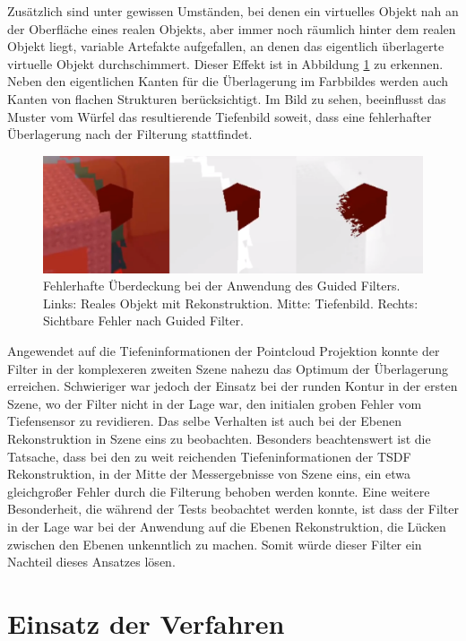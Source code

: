 Zusätzlich sind unter gewissen Umständen, bei denen ein virtuelles Objekt nah an der Oberfläche eines realen Objekts, aber immer noch räumlich hinter dem realen Objekt liegt, variable Artefakte aufgefallen, an denen das eigentlich überlagerte virtuelle Objekt durchschimmert. Dieser Effekt ist in Abbildung \ref{fig:artifacts} zu erkennen. Neben den eigentlichen Kanten für die Überlagerung im Farbbildes werden auch Kanten von flachen Strukturen berücksichtigt. Im Bild zu sehen, beeinflusst das Muster vom Würfel das resultierende Tiefenbild soweit, dass eine fehlerhafter Überlagerung nach der Filterung stattfindet. \\
 
\begin{figure}[h]
  \centering
	\includegraphics[width=1.0\textwidth]{content/images/artifacts.png} 
  \caption{Fehlerhafte Überdeckung bei der Anwendung des Guided Filters. Links: Reales Objekt mit Rekonstruktion. Mitte: Tiefenbild. Rechts: Sichtbare Fehler nach Guided Filter.}
  \label{fig:artifacts}
\end{figure}

Angewendet auf die Tiefeninformationen der Pointcloud Projektion konnte der Filter in der komplexeren zweiten Szene nahezu das Optimum der Überlagerung erreichen. Schwieriger war jedoch der Einsatz bei der runden Kontur in der ersten Szene, wo der Filter nicht in der Lage war, den initialen groben Fehler vom Tiefensensor zu revidieren. Das selbe Verhalten ist auch bei der Ebenen Rekonstruktion in Szene eins zu beobachten. Besonders beachtenswert ist die Tatsache, dass bei den zu weit reichenden Tiefeninformationen der TSDF Rekonstruktion, in der Mitte der Messergebnisse von Szene eins, ein etwa gleichgroßer Fehler durch die Filterung behoben werden konnte. Eine weitere Besonderheit, die während der Tests beobachtet werden konnte, ist dass der Filter in der Lage war bei der Anwendung auf die Ebenen Rekonstruktion, die Lücken zwischen den Ebenen unkenntlich zu machen. Somit würde dieser Filter ein Nachteil dieses Ansatzes lösen.\\

\section{Einsatz der Verfahren}

